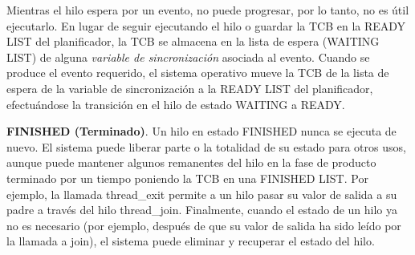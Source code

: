 \documentclass[10pt]{book}
\begin{document}
Mientras el hilo espera por un evento, no puede progresar, por lo tanto, no es útil ejecutarlo. En lugar de seguir ejecutando el hilo o guardar la TCB en la READY LIST del planificador, la TCB se almacena en la lista de espera (WAITING LIST) de alguna \textit{variable de sincronización} asociada al evento. Cuando se produce el evento requerido, el sistema operativo mueve la TCB de la lista de espera de la variable de sincronización a la READY LIST del planificador, efectuándose la transición en el hilo de estado WAITING a READY.

\textbf{FINISHED (Terminado)}. Un hilo en estado FINISHED nunca se ejecuta de nuevo. El sistema puede liberar parte o la totalidad de su estado para otros usos, aunque puede mantener algunos remanentes del hilo en la fase de producto terminado por un tiempo poniendo la TCB en una FINISHED LIST. Por ejemplo, la llamada {\mf thread\_exit} permite a un hilo pasar su valor de salida a su padre a través del hilo {\mf thread\_join}. Finalmente, cuando el estado de un hilo ya no es necesario (por ejemplo, después de que su valor de salida ha sido leído por la llamada a {\mf join}), el sistema puede eliminar y recuperar el estado del hilo.
\end{document}
